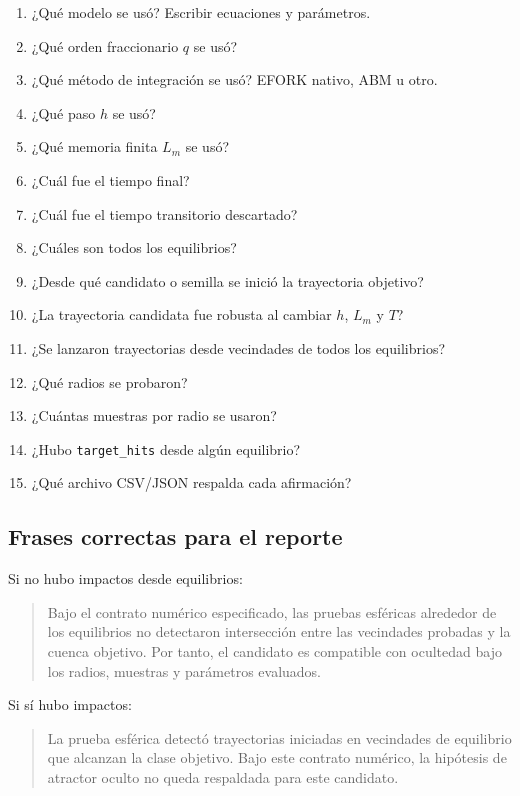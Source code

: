 \documentclass[11pt,letterpaper]{article}
\begin{document}
\begin{enumerate}[label=\arabic*)]
  \item ¿Qué modelo se usó? Escribir ecuaciones y parámetros.
  \item ¿Qué orden fraccionario $q$ se usó?
  \item ¿Qué método de integración se usó? EFORK nativo, ABM u otro.
  \item ¿Qué paso $h$ se usó?
  \item ¿Qué memoria finita $L_m$ se usó?
  \item ¿Cuál fue el tiempo final?
  \item ¿Cuál fue el tiempo transitorio descartado?
  \item ¿Cuáles son todos los equilibrios?
  \item ¿Desde qué candidato o semilla se inició la trayectoria objetivo?
  \item ¿La trayectoria candidata fue robusta al cambiar $h$, $L_m$ y $T$?
  \item ¿Se lanzaron trayectorias desde vecindades de todos los equilibrios?
  \item ¿Qué radios se probaron?
  \item ¿Cuántas muestras por radio se usaron?
  \item ¿Hubo \texttt{target\_hits} desde algún equilibrio?
  \item ¿Qué archivo CSV/JSON respalda cada afirmación?
\end{enumerate}

\subsection{Frases correctas para el reporte}

Si no hubo impactos desde equilibrios:

\begin{quote}
Bajo el contrato numérico especificado, las pruebas esféricas alrededor de los equilibrios no detectaron intersección entre las vecindades probadas y la cuenca objetivo. Por tanto, el candidato es compatible con ocultedad bajo los radios, muestras y parámetros evaluados.
\end{quote}

Si sí hubo impactos:

\begin{quote}
La prueba esférica detectó trayectorias iniciadas en vecindades de equilibrio que alcanzan la clase objetivo. Bajo este contrato numérico, la hipótesis de atractor oculto no queda respaldada para este candidato.
\end{quote}
\end{document}
